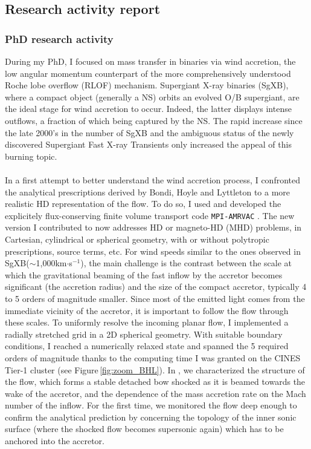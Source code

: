 \documentclass[a4paper,12pt,onecolumn]{article}
\makeatletter
\newcommand{\sgx}{SgXB\xspace}
\newcommand*{\ns}{NS\@\xspace}
\makeatother
\begin{document}
\subsection*{Research activity report}

\subsubsection*{PhD research activity}

\indent During my PhD, I focused on mass transfer in binaries via wind accretion, the low angular momentum counterpart of the more comprehensively understood Roche lobe overflow (RLOF) mechanism. Supergiant X-ray binaries (\sgx), where a compact object (generally a \ns) orbits an evolved O/B supergiant, are the ideal stage for wind accretion to occur. Indeed, the latter displays intense outflows, a fraction of which being captured by the \ns. The rapid increase since the late 2000’s in the number of \sgx \citep{Walter15} and the ambiguous status of the newly discovered Supergiant Fast X-ray Transients \citep[SFXT,][]{Negueruela2006} only increased the appeal of this burning topic.\\ \\
\indent In a first attempt to better understand the wind accretion process, I confronted the analytical prescriptions derived by Bondi, Hoyle and Lyttleton \citep[BHL,][]{Hoyle:1939fl,Bondi1944} to a more realistic HD representation of the flow. To do so, I used and developed the explicitely flux-conserving finite volume transport code \texttt{MPI-AMRVAC} \citep{Xia2017}. The new version I contributed to now addresses HD or magneto-HD (MHD) problems, in Cartesian, cylindrical or spherical geometry, with or without polytropic prescriptions, source terms, etc. For wind speeds similar to the ones observed in \sgx ($\sim$1,000km$\cdot$s$^{-1}$), the main challenge is the contrast between the scale at which the gravitational beaming of the fast inflow by the accretor becomes significant (the accretion radius) and the size of the compact accretor, typically 4 to 5 orders of magnitude smaller. Since most of the emitted light comes from the immediate vicinity of the accretor, it is important to follow the flow through these scales. To uniformly resolve the incoming planar flow, I implemented a radially stretched grid in a 2D spherical geometry. With suitable boundary conditions, I reached a numerically relaxed state and spanned the 5 required orders of magnitude thanks to the computing time I was granted on the CINES Tier-1 cluster (see Figure\,\ref{fig:zoom_BHL}). In \cite{ElMellah2015}, we characterized the structure of the flow, which forms a stable detached bow shocked as it is beamed towards the wake of the accretor, and the dependence of the mass accretion rate on the Mach number of the inflow. For the first time, we monitored the flow deep enough to confirm the analytical prediction by \cite{Foglizzo1997} concerning the topology of the inner sonic surface (where the shocked flow becomes supersonic again) which has to be anchored into the accretor.\\ \\
\end{document}
